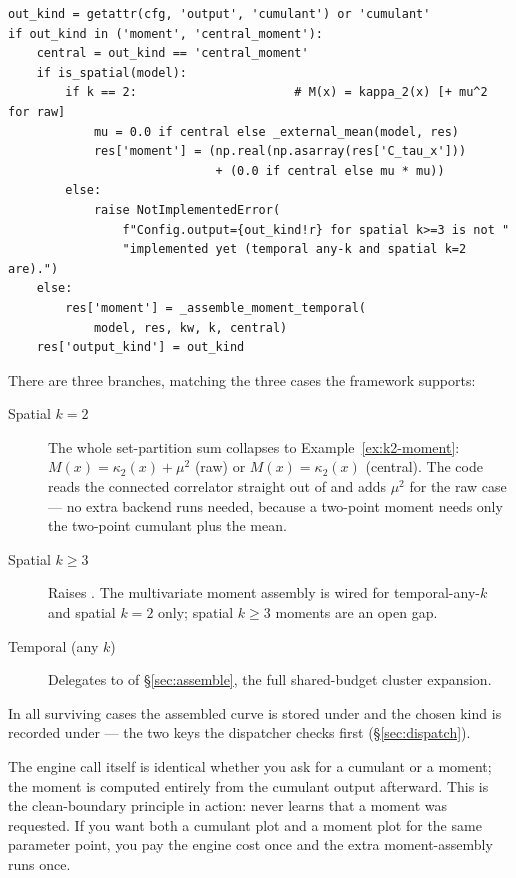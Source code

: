 \begin{lstlisting}
out_kind = getattr(cfg, 'output', 'cumulant') or 'cumulant'
if out_kind in ('moment', 'central_moment'):
    central = out_kind == 'central_moment'
    if is_spatial(model):
        if k == 2:                      # M(x) = kappa_2(x) [+ mu^2 for raw]
            mu = 0.0 if central else _external_mean(model, res)
            res['moment'] = (np.real(np.asarray(res['C_tau_x']))
                             + (0.0 if central else mu * mu))
        else:
            raise NotImplementedError(
                f"Config.output={out_kind!r} for spatial k>=3 is not "
                "implemented yet (temporal any-k and spatial k=2 are).")
    else:
        res['moment'] = _assemble_moment_temporal(
            model, res, kw, k, central)
    res['output_kind'] = out_kind
\end{lstlisting}

There are three branches, matching the three cases the framework supports:

\begin{description}
  \item[Spatial $k=2$] The whole set-partition sum collapses to
        Example~\ref{ex:k2-moment}: $M(x)=\kappa_2(x)+\mu^{2}$ (raw) or
        $M(x)=\kappa_2(x)$ (central). The code reads the connected correlator
        straight out of  and adds $\mu^2$ for the raw case --- no
        extra backend runs needed, because a two-point moment needs only the
        two-point cumulant plus the mean.
  \item[Spatial $k\!\ge\!3$] Raises . The multivariate
        moment assembly is wired for temporal-any-$k$ and spatial $k=2$ only;
        spatial $k\!\ge\!3$ moments are an open gap.
  \item[Temporal (any $k$)] Delegates to  of
        \S\ref{sec:assemble}, the full shared-budget cluster expansion.
\end{description}

In all surviving cases the assembled curve is stored under 
and the chosen kind is recorded under  --- the two keys
the dispatcher checks first (\S\ref{sec:dispatch}).

\begin{note}
The engine call itself is identical whether you ask for a cumulant or a moment;
the moment is computed entirely from the cumulant output afterward. This is the
clean-boundary principle in action:  never learns that a
moment was requested. If you want both a cumulant plot and a moment plot for the
same parameter point, you pay the engine cost once and the extra moment-assembly
runs once.
\end{note}

